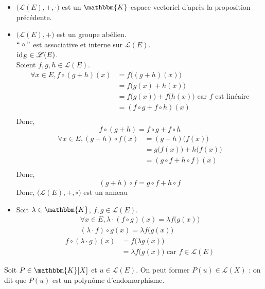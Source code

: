 \begin{prv}
	\begin{itemize}
		\item $\big(\mathcal{L}(E), +, \cdot \big)$ est un $\mathbbm{K}$-espace vectoriel d'après la proposition précédente.
		\item $\big(\mathcal{L}(E), +\big)$ est un groupe abélien.\\
			$``\circ"$ est associative et interne sur $\mathcal{L}(E)$.\\
			$\operatorname{id}_E \in \mathcal{L}(E)$.\\
			Soient $f, g, h \in \mathcal{L}(E)$.
			\begin{align*}
				\forall x \in E,
				f \circ (g + h)(x) &= f\big((g+h)(x)\big) \\
				&= f\big(g(x) + h(x)\big)\\
				&= f\big(g(x)\big) + f\big(h(x)\big) \text{ car $f$ est linéaire}\\
				&= (f \circ g + f \circ h) (x) \\
			\end{align*}
			Donc, \[
				f \circ (g+h) = f \circ g + f \circ h
			\]
			\begin{align*}
				\forall x \in E,
				(g+h) \circ f(x) &= (g+h)\big(f(x)\big) \\
				&= g\big(f(x)\big) + h\big(f(x)\big) \\
				&= (g \circ f + h \circ f)(x) \\
			\end{align*}
			Donc, \[
				(g+h) \circ f = g \circ f + h \circ f
			\]
			Donc, $\big(\mathcal{L}(E), +,  \circ \big)$ est un anneau
		\item Soit $\lambda \in \mathbbm{K}$, $f,g \in \mathcal{L}(E)$.
			\begin{align*}
				\forall x \in E, 
				\lambda \cdot (f \circ g)(x) = \lambda f\big(g(x)\big)\\
				(\lambda \cdot f) \circ g(x) = \lambda f\big(g(x)\big)
			\end{align*}
			\begin{align*}
				f \circ (\lambda \cdot g) (x) &= f\big(\lambda g(x)\big) \\
				&= \lambda f\big(g(x)\big) \text{ car } f \in \mathcal{L}(E)
			\end{align*}
	\end{itemize}
\end{prv}

\begin{crlr}
	Soit $P \in \mathbbm{K}[X]$ et $ u \in \mathcal{L}(E)$. On peut former $P(u) \in \mathcal{L}(X)$ : on dit que $P(u)$ est un polynôme d'endomorphisme.
\end{crlr}


